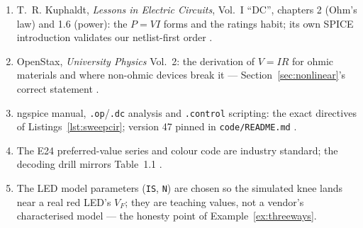 \chapternotes

\begin{enumerate}
\item T.~R. Kuphaldt, \emph{Lessons in Electric Circuits}, Vol.~I ``DC'',
chapters 2 (Ohm's law) and 1.6 (power): the $P=VI$ forms and the ratings
habit; its own SPICE introduction validates our netlist-first order
\cite{aacvol1}.
\item OpenStax, \emph{University Physics} Vol.~2: the derivation of
$V=IR$ for ohmic materials and where non-ohmic devices break it —
Section~\ref{sec:nonlinear}'s correct statement \cite{openstaxv2}.
\item ngspice manual, \texttt{.op}/\texttt{.dc} analysis and \texttt{.control}
scripting: the exact directives of Listings~\ref{lst:sweepcir}; version 47
pinned in \texttt{code/README.md} \cite{ngspice}.
\item The E24 preferred-value series and colour code are industry standard;
the decoding drill mirrors Table~1.1 \cite{aacvol1}.
\item The LED model parameters (\texttt{IS}, \texttt{N}) are chosen so the
simulated knee lands near a real red LED's $V_F$; they are teaching values,
not a vendor's characterised model — the honesty point of
Example~\ref{ex:threeways}.
\end{enumerate}

